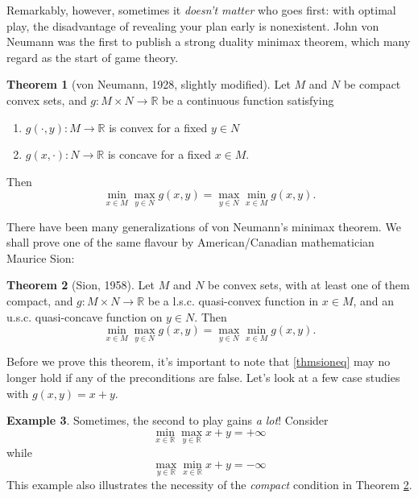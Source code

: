 \documentclass[11pt]{article}
\numberwithin{equation}{section}
\theoremstyle{definition}
\newtheorem{theorem}{Theorem}[section]
\newtheorem{example}[theorem]{Example}
\newcommand{\bR}{\mathbb{R}}
\begin{document}
Remarkably, however, sometimes it \textit{doesn't matter} who goes first: with optimal play, the disadvantage of revealing your plan early is nonexistent. John von Neumann was the first to publish a strong duality minimax theorem, which many regard as the start of game theory.
\begin{theorem}[von Neumann, 1928, slightly modified]
    Let $M$ and $N$ be compact convex sets, and $g:M\times N\to\bR$ be a continuous function satisfying
    \begin{enumerate}[label=(\roman*)]
        \item $g(\cdot, y):M\to\bR$ is convex for a fixed $y\in N$
        \item $g(x, \cdot):N\to\bR$ is concave for a fixed $x\in M$.
    \end{enumerate}
    \vspace{0.8\baselineskip}Then
    \begin{equation}
        \min_{x\in M}\max_{y\in N} g(x,y)= \max_{y\in N}\min_{x\in M} g(x,y).
    \end{equation}
\end{theorem}
There have been many generalizations of von Neumann's minimax theorem. We shall prove one of the same flavour by American/Canadian mathematician Maurice Sion:
\begin{theorem}[Sion, 1958]
    \label{thmsion}
    Let $M$ and $N$ be convex sets, with at least one of them compact, and $g:M\times N\to\bR$ be a l.s.c. quasi-convex function in $x\in M$, and an u.s.c. quasi-concave function on $y\in N$. Then
    \begin{equation}
        \label{thmsioneq}
        \min_{x\in M}\max_{y\in N} g(x,y)= \max_{y\in N}\min_{x\in M} g(x,y).
    \end{equation}
\end{theorem}
Before we prove this theorem, it's important to note that \ref{thmsioneq} may no longer hold if any of the preconditions are false. Let's look at a few case studies with $g(x,y)=x+y$.
\begin{example}
    Sometimes, the second to play gains \textit{a lot}! Consider
    \begin{equation}
        \min_{x\in\bR}\max_{y\in\bR} x+y=+\infty
    \end{equation}
    while
    \begin{equation}
        \max_{y\in\bR}\min_{x\in\bR} x+y=-\infty
    \end{equation}
    This example also illustrates the necessity of the \textit{compact} condition in Theorem \ref{thmsion}.
\end{example}
\end{document}

